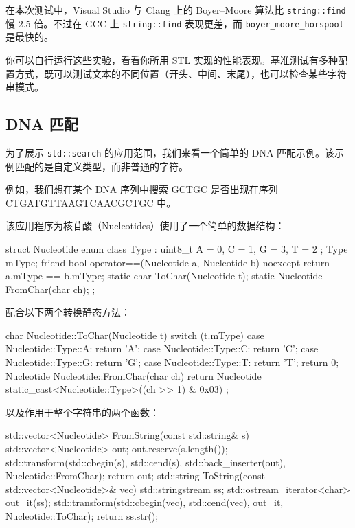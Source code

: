 在本次测试中，Visual Studio 与 Clang 上的 Boyer–Moore 算法比 \texttt{string::find} 慢 2.5 倍。不过在 GCC 上 \texttt{string::find} 表现更差，而 \texttt{boyer\_moore\_horspool} 是最快的。


你可以自行运行这些实验，看看你所用 STL 实现的性能表现。基准测试有多种配置方式，既可以测试文本的不同位置（开头、中间、末尾），也可以检查某些字符串模式。

\subsection{DNA 匹配}

为了展示 \texttt{std::search} 的应用范围，我们来看一个简单的 DNA 匹配示例。该示例匹配的是自定义类型，而非普通的字符。

例如，我们想在某个 DNA 序列中搜索 GCTGC 是否出现在序列 CTGATGTTAAGTCAACGCTGC 中。

该应用程序为核苷酸（Nucleotides）使用了一个简单的数据结构：

\begin{codebox}[cpp]
struct Nucleotide
{
enum class Type : uint8_t {
A = 0,
C = 1,
G = 3,
T = 2
};
Type mType;
friend bool operator==(Nucleotide a, Nucleotide b) noexcept
{
return a.mType == b.mType;
}
static char ToChar(Nucleotide t);
static Nucleotide FromChar(char ch);
};
\end{codebox}

配合以下两个转换静态方法：

\begin{codebox}[cpp]
char Nucleotide::ToChar(Nucleotide t)
{
switch (t.mType)
{
case Nucleotide::Type::A: return 'A';
case Nucleotide::Type::C: return 'C';
case Nucleotide::Type::G: return 'G';
case Nucleotide::Type::T: return 'T';
}
return 0;
}
Nucleotide Nucleotide::FromChar(char ch)
{
return Nucleotide { static_cast<Nucleotide::Type>((ch >> 1) & 0x03) };
}
\end{codebox}

以及作用于整个字符串的两个函数：

\begin{codebox}[cpp]
std::vector<Nucleotide> FromString(const std::string& s)
{
std::vector<Nucleotide> out;
out.reserve(s.length());
std::transform(std::cbegin(s), std::cend(s),
std::back_inserter(out), Nucleotide::FromChar);
return out;
}
std::string ToString(const std::vector<Nucleotide>& vec)
{
std::stringstream ss;
std::ostream_iterator<char> out_it(ss);
std::transform(std::cbegin(vec), std::cend(vec), out_it, Nucleotide::ToChar);
return ss.str();
}
\end{codebox}

